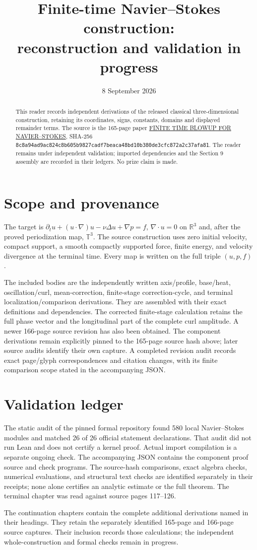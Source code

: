 \documentclass[10pt,a4paper]{article}
\title{Finite-time Navier--Stokes construction:\\reconstruction and validation in progress}
\author{}\date{8 September 2026}
\newcounter{none}
\begin{document}
\maketitle
\begin{abstract}
This reader records independent derivations of the released classical three-dimensional construction, retaining its coordinates, signs, constants, domains and displayed remainder terms. The source is the 165-page paper \href{https://cdn.openai.com/pdf/32d9f210-8b73-45e0-91bc-82a30aef8a9a/navier-stokes.pdf}{FINITE TIME BLOWUP FOR NAVIER--STOKES}, SHA-256 \texttt{8c8a94ad9ac824c8b605b9827cadf7beaca48bd10b380de3cfc872a2c37afa81}. The reader remains under independent validation; imported dependencies and the Section 9 assembly are recorded in their ledgers. No prize claim is made.
\end{abstract}\tableofcontents
\section{Scope and provenance}
The target is $\partial_tu+(u\cdot\nabla)u-\nu\Delta u+\nabla p=f$, $\nabla\cdot u=0$ on $\mathbb R^3$ and, after the proved periodization map, $\mathbb T^3$. The source construction uses zero initial velocity, compact support, a smooth compactly supported force, finite energy, and velocity divergence at the terminal time. Every map is written on the full triple $(u,p,f)$.

The included bodies are the independently written axis/profile, base/heat, oscillation/curl, mean-correction, finite-stage correction-cycle, and terminal localization/comparison derivations. They are assembled with their exact definitions and dependencies. The corrected finite-stage calculation retains the full phase vector and the longitudinal part of the complete curl amplitude. A newer 166-page source revision has also been obtained. The component derivations remain explicitly pinned to the 165-page source hash above; later source audits identify their own capture. A completed revision audit records exact page/glyph correspondences and citation changes, with its finite comparison scope stated in the accompanying JSON.
\section{Validation ledger}
The static audit of the pinned formal repository found 580 local Navier--Stokes modules and matched 26 of 26 official statement declarations. That audit did not run Lean and does not certify a kernel proof. Actual import compilation is a separate ongoing check. The accompanying JSON contains the component proof source and check programs. The source-hash comparisons, exact algebra checks, numerical evaluations, and structural text checks are identified separately in their receipts; none alone certifies an analytic estimate or the full theorem. The terminal chapter was read against source pages 117--126.
\par
The continuation chapters contain the complete additional derivations named in
their headings. They retain the separately identified 165-page and 166-page
source captures. Their inclusion records those calculations; the independent
whole-construction and formal checks remain in progress.
\end{document}
